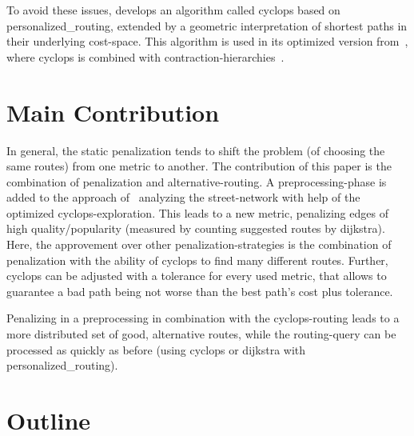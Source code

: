         To avoid these issues, \cite{barth:alternative_routes} develops an algorithm called \gls{cyclops} based on \gls{personalized_routing}, extended by a geometric interpretation of shortest paths in their underlying cost-space.
        This algorithm is used in its optimized version from~\cite{barth:alternative_multicriteria_routes}, where \gls{cyclops} is combined with \gls{contraction-hierarchies}~\cite{geisberger:contraction_hierarchies}.

\section{Main Contribution}

    In general, the static penalization tends to shift the problem (of choosing the same routes) from one metric to another.
    The contribution of this paper is the combination of penalization and alternative-routing.
    A preprocessing-phase is added to the approach of~\cite{barth:alternative_multicriteria_routes} analyzing the street-network with help of the optimized \gls{cyclops}-exploration.
    This leads to a new metric, penalizing edges of high quality/popularity (measured by counting suggested routes by \gls{dijkstra}).
    Here, the approvement over other penalization-strategies is the combination of penalization with the ability of \gls{cyclops} to find many different routes.
    Further, \gls{cyclops} can be adjusted with a tolerance for every used metric, that allows to guarantee a bad path being not worse than the best path's cost plus tolerance.

    Penalizing in a preprocessing in combination with the \gls{cyclops}-routing leads to a more distributed set of good, alternative routes, while the routing-query can be processed as quickly as before (using \gls{cyclops} or \gls{dijkstra} with \gls{personalized_routing}).

\section{Outline}

